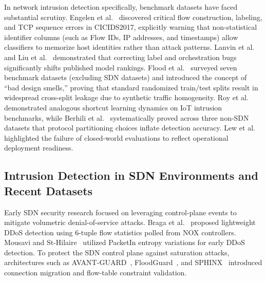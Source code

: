 \documentclass[journal]{IEEEtran}
\begin{document}
In network intrusion detection specifically, benchmark datasets have faced substantial scrutiny. Engelen et al.~\cite{engelen2021troubleshooting} discovered critical flow construction, labeling, and TCP sequence errors in CICIDS2017, explicitly warning that non-statistical identifier columns (such as Flow IDs, IP addresses, and timestamps) allow classifiers to memorize host identities rather than attack patterns. Lanvin et al.~\cite{lanvin2022errors} and Liu et al.~\cite{liu2022error} demonstrated that correcting label and orchestration bugs significantly shifts published model rankings. Flood et al.~\cite{flood2024baddesign} surveyed seven benchmark datasets (excluding SDN datasets) and introduced the concept of ``bad design smells,'' proving that standard randomized train/test splits result in widespread cross-split leakage due to synthetic traffic homogeneity. Roy et al.~\cite{roy2026unmasking} demonstrated analogous shortcut learning dynamics on IoT intrusion benchmarks, while Berhili et al.~\cite{berhili2026evaluation} systematically proved across three non-SDN datasets that protocol partitioning choices inflate detection accuracy. Lew et al.~\cite{lew2026deployment} highlighted the failure of closed-world evaluations to reflect operational deployment readiness.

\subsection{Intrusion Detection in SDN Environments and Recent Datasets}
Early SDN security research focused on leveraging control-plane events to mitigate volumetric denial-of-service attacks. Braga et al.~\cite{braga2010lightweight} proposed lightweight DDoS detection using 6-tuple flow statistics polled from NOX controllers. Mousavi and St-Hilaire~\cite{mousavi2015early} utilized PacketIn entropy variations for early DDoS detection. To protect the SDN control plane against saturation attacks, architectures such as AVANT-GUARD~\cite{shin2013avantguard}, FloodGuard~\cite{wang2015floodguard}, and SPHINX~\cite{dhawan2015sphinx} introduced connection migration and flow-table constraint validation.
\end{document}

